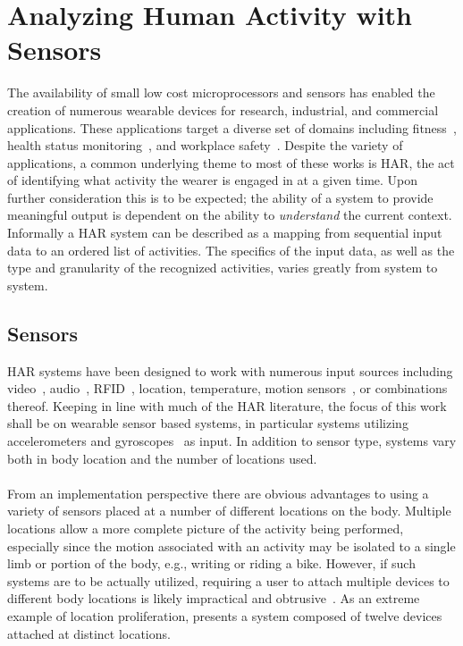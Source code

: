 \documentclass[12pt]{report}
\newcommand{\1}[0]{\mathbbm{1}}
\begin{document}
\chapter{Analyzing Human Activity with Sensors}
\label{chap:Analyzing Human Activity with Sensors}
The availability of small low cost microprocessors and sensors has
enabled the creation of numerous wearable devices for research, industrial,
and commercial applications. These applications target a diverse set of domains
including fitness~\cite{long-term-devices},
health status monitoring~\cite{elderly,health-survey},
and workplace safety~\cite{assembly-activity}.
Despite the variety of applications, a common underlying theme to most of these
works is \ac{HAR}, the act of identifying what activity the wearer is engaged in at a given time.
Upon further consideration this is to be expected; the ability of a system to provide
meaningful output is dependent on the ability to \emph{understand} the current context.
Informally a \ac{HAR} system can be described as a mapping from sequential
input data to an ordered list of activities. The specifics of the input data, as well
as the type and granularity of the recognized activities, varies greatly from system to system.

\section{Sensors}
\label{sec:HAR-Sensors}
\ac{HAR} systems have been designed to work with numerous input sources including
video~\cite{har-vision-survey},
audio~\cite{assembly-activity},
RFID~\cite{har-video-rfid},
location, temperature, motion sensors~\cite{har-survey},
or combinations thereof.
Keeping in line with much of the \ac{HAR} literature,
the focus of this work shall be on wearable sensor based systems,
in particular systems utilizing accelerometers and gyroscopes~\cite{multiple-sensor-bao}
as input. In addition to sensor type, systems vary both in body location
and the number of locations used.
\\\\
From an implementation perspective there are obvious advantages to using a
variety of sensors placed at a number of different locations on the body. Multiple
locations allow a more complete picture of the activity being performed,
especially since the motion associated with an activity may be isolated to a
single limb or portion of the body, e.g., writing or riding a bike. However, if such
systems are to be actually utilized, requiring a user to attach multiple devices to
different body locations is likely impractical and obtrusive~\cite{har-survey}.
As an extreme example of location proliferation, \cite{many-sensor-locations} presents a
system composed of twelve devices attached at distinct locations.
\end{document}
